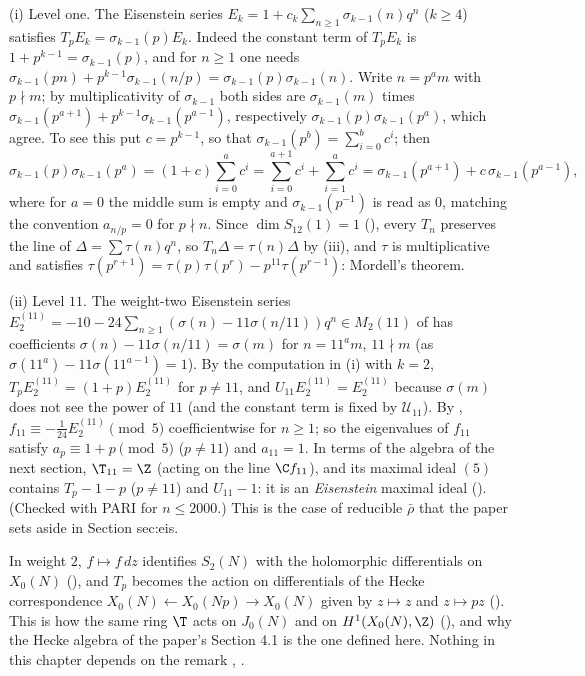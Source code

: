 \begin{example}\label{ex:hecke:eisenstein-and-delta}
(i) Level one. The Eisenstein series $E_k=1+c_k\sum_{n\ge1}\sigma_{k-1}(n)q^n$ ($k\ge4$) satisfies $T_pE_k=\sigma_{k-1}(p)E_k$. Indeed the constant term of $T_pE_k$ is $1+p^{k-1}=\sigma_{k-1}(p)$,
and for $n\ge1$ one needs $\sigma_{k-1}(pn)+p^{k-1}\sigma_{k-1}(n/p)=\sigma_{k-1}(p)\sigma_{k-1}(n)$. Write $n=p^am$ with $p\nmid m$; by multiplicativity of $\sigma_{k-1}$ both sides are $\sigma_{k-1}(m)$
times $\sigma_{k-1}(p^{a+1})+p^{k-1}\sigma_{k-1}(p^{a-1})$, respectively $\sigma_{k-1}(p)\sigma_{k-1}(p^a)$, which agree. To see this put $c=p^{k-1}$, so that
$\sigma_{k-1}(p^b)=\sum_{i=0}^bc^i$; then
\[
\sigma_{k-1}(p)\sigma_{k-1}(p^a)=(1+c)\sum_{i=0}^ac^i=\sum_{i=0}^{a+1}c^i+\sum_{i=1}^ac^i=\sigma_{k-1}(p^{a+1})+c\,\sigma_{k-1}(p^{a-1}),
\]
where for $a=0$ the middle sum is empty and $\sigma_{k-1}(p^{-1})$ is read as $0$, matching the convention $a_{n/p}=0$ for $p\nmid n$.
Since $\dim S_{12}(1)=1$ (), every $T_n$ preserves the line of $\Delta=\sum\tau(n)q^n$, so $T_n\Delta=\tau(n)\Delta$ by (iii), and $\tau$ is multiplicative
and satisfies $\tau(p^{r+1})=\tau(p)\tau(p^r)-p^{11}\tau(p^{r-1})$: Mordell's theorem.

(ii) Level $11$. The weight-two Eisenstein series $E_2^{(11)}=-10-24\sum_{n\ge1}(\sigma(n)-11\sigma(n/11))q^n\in M_2(11)$ of  has coefficients
$\sigma(n)-11\sigma(n/11)=\sigma(m)$ for $n=11^am$, $11\nmid m$ (as $\sigma(11^a)-11\sigma(11^{a-1})=1$). By the computation in (i) with $k=2$, $T_pE_2^{(11)}=(1+p)E_2^{(11)}$ for $p\ne11$, and
$U_{11}E_2^{(11)}=E_2^{(11)}$ because $\sigma(m)$ does not see the power of $11$ (and the constant term is fixed by $\mathcal U_{11}$). By , $f_{11}\equiv-\frac1{24}E_2^{(11)}\pmod5$
coefficientwise for $n\ge1$; so the eigenvalues of $f_{11}$ satisfy $a_p\equiv1+p\pmod5$ ($p\ne11$) and $a_{11}=1$. In terms of the algebra of the next section, $\T_{11}=\Z$ (acting on the
line $\C f_{11}$), and its maximal ideal $(5)$ contains $T_p-1-p$ ($p\ne11$) and $U_{11}-1$: it is an \emph{Eisenstein} maximal ideal (). (Checked with PARI for
$n\le2000$.) This is the case of reducible $\bar\rho$ that the paper sets aside in Section sec:eis.
\end{example}

\begin{remark}\label{rem:hecke:correspondences}
In weight $2$, $f\mapsto f\,dz$ identifies $S_2(N)$ with the holomorphic differentials on $X_0(N)$ (), and $T_p$ becomes the action on differentials of the
Hecke correspondence $X_0(N)\leftarrow X_0(Np)\rightarrow X_0(N)$ given by $z\mapsto z$ and $z\mapsto pz$ (). This is how the same ring $\T$ acts on $J_0(N)$ and on
$H^1(X_0(N),\Z)$ (), and why the Hecke algebra of the paper's Section 4.1 is the one defined here. Nothing in this chapter depends on the remark
\cite[Section 6.3]{DiamondShurman}, \cite[Section 7.2]{Shimura71}.
\end{remark}

